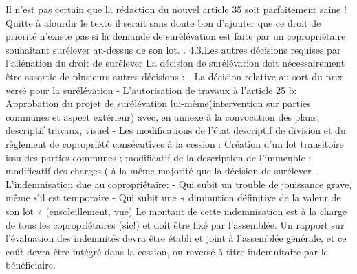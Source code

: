 	Il n’est pas certain que la rédaction du nouvel article 35 soit parfaitement saine ! Quitte à alourdir le texte il serait sans doute bon d’ajouter que ce droit de priorité n’existe pas si la demande de surélévation est faite par un copropriétaire souhaitant surélever au-dessus de son lot.
	.
	4.3.Les autres décisions requises par l’aliénation du droit de surélever
	La décision de surélévation doit nécessairement être assortie de plusieurs autres décisions :
	- La décision relative au sort du prix versé pour la surélévation
	- L’autorisation de travaux à l’article 25 b:
	Approbation du projet de surélévation lui-même(intervention sur parties communes et aspect extérieur) avec, en annexe à la convocation des plans, descriptif travaux, visuel
	- Les modifications de l’état descriptif de division et du règlement de copropriété consécutives à la cession :
	Création d’un lot transitoire issu des parties communes ; modificatif de la description de l’immeuble ; modificatif des charges ( à la même majorité que la décision de surélever
	- L’indemnisation due au copropriétaire:
	- Qui subit un trouble de jouissance grave, même s’il est temporaire
	- Qui subit une « diminution définitive de la valeur de son lot » (ensoleillement, vue)
	Le montant de cette indemnisation est à la charge de tous les copropriétaires (sic!) et doit être fixé par l’assemblée. Un rapport sur l’évaluation des indemnités devra être établi et joint à l’assemblée générale, et ce coût devra être intégré dans la cession, ou reversé à titre indemnitaire par le bénéficiaire.